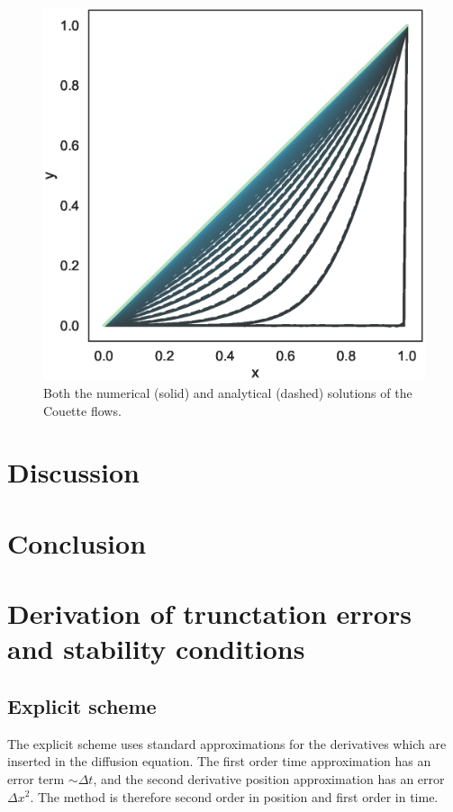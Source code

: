 \documentclass[aps,reprint]{revtex4-1}
\newcommand\blankpage{%
  \null
  \thispagestyle{empty}%
  \addtocounter{page}{-1}%
  \newpage}
\begin{document}
\begin{figure}[ht]
  \centering
  \includegraphics[width=\columnwidth]{figures/couette_numeric_vs_analytical.eps}
  \caption{\label{fig:couettenumanalytic} Both the numerical (solid) and analytical
    (dashed) solutions of the Couette flows. }
\end{figure}
\section{Discussion} \label{sec:discussion}
\section{Conclusion} \label{sec:conclusion}

\blankpage
\appendix
\section{Derivation of trunctation errors and stability conditions} \label{sec:errors}
\subsection{Explicit scheme}
The explicit scheme uses standard approximations for the derivatives which are
inserted in the diffusion equation. The first order time approximation has
an error term $\sim \Delta{t}$, and the second derivative position approximation
has an error $\Delta{x^2}$. The method is therefore second order in position and
first order in time.
\end{document}
